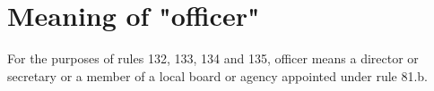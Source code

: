 \section{Meaning of "officer"}

For the purposes of rules 132, 133, 134 and 135, officer means a director or secretary or a member of a local board or agency appointed under rule 81.b. 